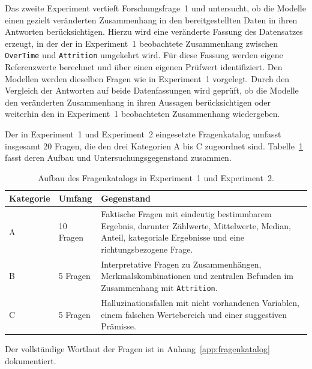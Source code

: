 Das zweite Experiment vertieft Forschungsfrage~1 und untersucht, ob die Modelle einen gezielt veränderten Zusammenhang in den bereitgestellten Daten in ihren Antworten berücksichtigen. Hierzu wird eine veränderte Fassung des Datensatzes erzeugt, in der der in Experiment~1 beobachtete Zusammenhang zwischen \texttt{OverTime} und \texttt{Attrition} umgekehrt wird. Für diese Fassung werden eigene Referenzwerte berechnet und über einen eigenen Prüfwert identifiziert. Den Modellen werden dieselben Fragen wie in Experiment~1 vorgelegt. Durch den Vergleich der Antworten auf beide Datenfassungen wird geprüft, ob die Modelle den veränderten Zusammenhang in ihren Aussagen berücksichtigen oder weiterhin den in Experiment~1 beobachteten Zusammenhang wiedergeben.

Der in Experiment~1 und Experiment~2 eingesetzte Fragenkatalog umfasst insgesamt 20 Fragen, die den drei Kategorien A bis C zugeordnet sind. Tabelle~\ref{tab:fragenkatalog-uebersicht} fasst deren Aufbau und Untersuchungsgegenstand zusammen.

\begin{table}[htbp]
\centering
\caption{Aufbau des Fragenkatalogs in Experiment~1 und Experiment~2.}
\label{tab:fragenkatalog-uebersicht}
\renewcommand{\arraystretch}{1.35}
\begin{tabularx}{\textwidth}{@{} l l >{\raggedright\arraybackslash}X @{}}
\toprule
\textbf{Kategorie} & \textbf{Umfang} & \textbf{Gegenstand} \\
\midrule

A & 10 Fragen &
Faktische Fragen mit eindeutig bestimmbarem Ergebnis, darunter Zählwerte,
Mittelwerte, Median, Anteil, kategoriale Ergebnisse und eine
richtungsbezogene Frage. \\
\addlinespace[0.6em]

B & 5 Fragen &
Interpretative Fragen zu Zusammenhängen, Merkmalskombinationen und
zentralen Befunden im Zusammenhang mit \texttt{Attrition}. \\
\addlinespace[0.6em]

C & 5 Fragen &
Halluzinationsfallen mit nicht vorhandenen Variablen, einem falschen
Wertebereich und einer suggestiven Prämisse. \\

\bottomrule
\end{tabularx}
\end{table}

Der vollständige Wortlaut der Fragen ist in Anhang~\ref{app:fragenkatalog} dokumentiert.


